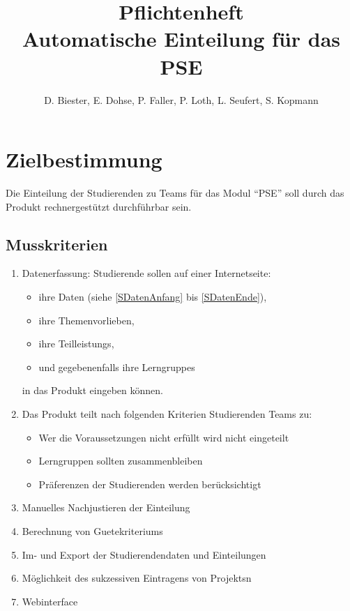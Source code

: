 \documentclass[parskip=full]{scrartcl}
\newcommand{\swtLabel}[1]{\textbf{/#1\arabic*0/}}
\begin{document}
\title{Pflichtenheft \\
        \large Automatische Einteilung für das PSE}

\author{D. Biester, E. Dohse, P. Faller, P. Loth, L. Seufert, S. Kopmann}
        
\maketitle
 
\pagebreak
\tableofcontents
\pagebreak

\section{Zielbestimmung}
Die Einteilung der Studierenden zu Teams für das Modul \enquote{\gls{PSE}} soll durch das Produkt
rechnergestützt durchführbar sein.


\subsection{Musskriterien}
 \begin{enumerate}[label=\swtLabel{M}]
   \item Datenerfassung: Studierende sollen auf einer Internetseite:   
   \begin{itemize}
     \item ihre Daten (siehe \ref{SDatenAnfang} bis \ref{SDatenEnde}),     
     \item ihre Themenvorlieben, 
     \item ihre \glspl{Teilleistung},
     \item und gegebenenfalls ihre \glspl{Lerngruppe}
   \end{itemize}
   in das Produkt eingeben können.
   \item Das Produkt teilt nach folgenden Kriterien Studierenden Teams zu:
   \begin{itemize}
     \item Wer die Voraussetzungen nicht erfüllt wird nicht eingeteilt
     \item Lerngruppen sollten zusammenbleiben
     \item Präferenzen der Studierenden werden berücksichtigt
   \end{itemize}
   
   \item Manuelles Nachjustieren der Einteilung
   \item Berechnung von \glspl{Guetekriterium}
   \item Im- und Export der Studierendendaten und
   Einteilungen %
   \item Möglichkeit des sukzessiven Eintragens von \glspl{Projekt}n
   \item Webinterface   
 \end{enumerate}
\end{document}
